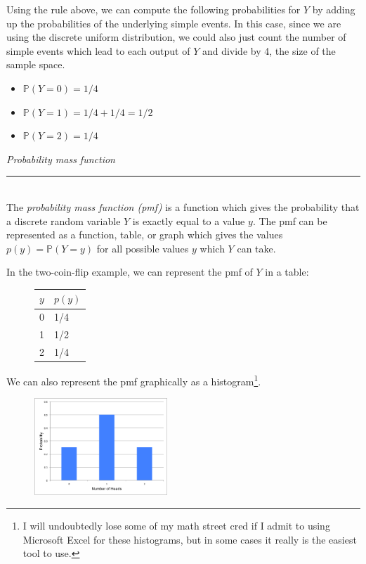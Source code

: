 \documentclass[12pt]{article}
\theoremstyle{definition}
\theoremstyle{remark}
\def\P{{\mathbb P}}
\begin{document}
Using the rule above, we can compute the following probabilities for $Y$ by adding up the probabilities of the underlying simple events. In this case, since we are using the discrete uniform distribution, we could also just count the number of simple events which lead to each output of $Y$ and divide by 4, the size of the sample space.
\begin{itemize}[noitemsep]
\item $\P(Y = 0) = 1/4$
\item $\P(Y = 1) = 1/4 + 1/4 = 1/2$
\item $\P(Y = 2) = 1/4$
\end{itemize}

\begin{framed}
  \emph{Probability mass function }\\
  \rule{\dimexpr{}\fboxrule}{.1pt} \\
  The \emph{probability mass function (pmf)} is a function which gives the probability that a discrete random variable $Y$ is exactly equal to a value $y$. The pmf can be represented as a function, table, or graph which gives the values $p(y) = \P(Y = y)$ for all possible values $y$ which $Y$ can take.
\end{framed}

In the two-coin-flip example, we can represent the pmf of $Y$ in a table:
\begin{figure}[H]
\centering
\begin{tabular}{l@{\hskip 2cm}l}
\toprule
$y$ & $p(y)$\\
\midrule
0 & 1/4\\
1 & 1/2\\
2 & 1/4\\
\bottomrule
\end{tabular}
\end{figure}

We can also represent the pmf graphically as a histogram\footnote{I will undoubtedly lose some of my math street cred if I admit to using Microsoft Excel for these histograms, but in some cases it really is the easiest tool to use.}.
\begin{figure}[H]
\centering
\includegraphics[width=5cm]{2coinshisto}
\end{figure}
\end{document}
